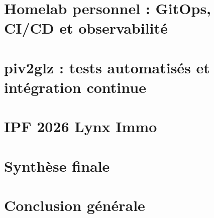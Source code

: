 \documentclass[11pt,a4paper]{report}
\begin{document}
\chapter{Homelab personnel : GitOps, CI/CD et observabilité}
\label{chap:homelab}
\begingroup


\endgroup
\chapter{piv2glz : tests automatisés et intégration continue}
\label{chap:piv2glz}


\chapter{IPF 2026 Lynx Immo}
\label{chap:lynx}
\begingroup
\let\cite\parencite






\endgroup
\chapter{Synthèse finale}
\label{chap:synthese}


\chapter*{Conclusion générale}


\clearpage
\printglossaries


\printbibliography
\appendix



\end{document}
